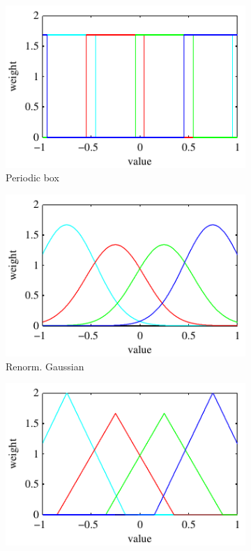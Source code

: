 \documentclass[thesis.tex]{subfiles}
\begin{document}
\begin{figure}[tb]
\begin{subfigure}[t]{0.32\textwidth}
		\includegraphics[width=\textwidth]{img/binFilterBoxPeriodic.pdf}
		\caption{Periodic box}
		\label{fig:1dFilterBoxPeriodic}
	\end{subfigure}
	\begin{subfigure}[t]{0.32\textwidth}
		\includegraphics[width=\textwidth]{img/binFilterGaussianRenorm.pdf}
		\caption{Renorm. Gaussian}
		\label{fig:1dFilterGaussianRenorm}
	\end{subfigure}
	\begin{subfigure}[t]{0.32\textwidth}
		\includegraphics[width=\textwidth]{img/binFilterTriangleRenorm.pdf}

\end{subfigure}
\end{figure}
\end{document}
